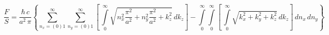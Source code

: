 \documentclass[twoside, 10pt, ptm]{article}
\begin{document}

\noindent
\begin{equation}\frac{F}{S} = \frac{\hbar\,c}{a^2\,\pi}\left\{\sum\limits_{n_x=(0)1}^{\infty}\sum\limits_{n_y=(0)1}^{\infty}\left[\,\int\limits_{0}^{\infty}\sqrt{n_x^2\frac{\pi^2}{a^2}+n_y^2\frac{\pi^2}{a^2}+k_z^2}\,dk_z\right] -
\int\limits_{0}^{\infty}\int\limits_{0}^{\infty}\left[\,\int\limits_{0}^{\infty}\sqrt{k_x^2+k_y^2+k_z^2}\,dk_z\right]\,dn_x\,dn_y\right\}\end{equation}
\end{document}
